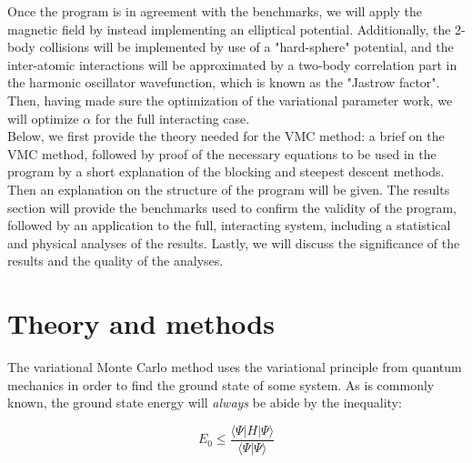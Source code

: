 \documentclass[english, a4paper]{article}
\begin{document}
Once the program is in agreement with the benchmarks, we will apply the magnetic field by instead implementing an elliptical potential. 
Additionally, the 2-body collisions will be implemented by use of a "hard-sphere" potential, and the inter-atomic interactions will be approximated by a two-body correlation part in the harmonic oscillator wavefunction, which is known as the "Jastrow factor". 
Then, having made sure the optimization of the variational parameter work, we will optimize $\alpha$ for the full interacting case.\\
Below, we first provide the theory needed for the VMC method: a brief on the VMC method, followed by proof of the necessary equations to be used in the program by a short explanation of the blocking and steepest descent methods. 
Then an explanation on the structure of the program will be given. 
The results section will provide the benchmarks used to confirm the validity of the program, followed by an application to the full, interacting system, including a statistical and physical analyses of the results. 
Lastly, we will discuss the significance of the results and the quality of the analyses.

\section{Theory and methods}

The variational Monte Carlo method uses the variational principle from quantum mechanics in order to find the ground state of some system. As is commonly known, the ground state energy will \emph{always} be abide by the inequality:

\begin{equation}
	E_{0} \leq \frac{\langle \Psi|H|\Psi\rangle}{\langle\Psi|\Psi\rangle}
\end{equation}
\end{document}
